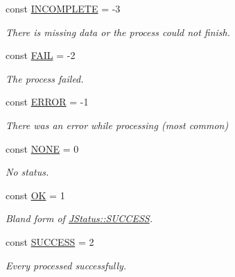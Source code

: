 \begin{DoxyCompactItemize}
\item 
\hypertarget{classJStatus_a7da9c102991a4a5a873fa435e6820dae}{const \hyperlink{classJStatus_a7da9c102991a4a5a873fa435e6820dae}{I\-N\-C\-O\-M\-P\-L\-E\-T\-E} = -\/3}\label{classJStatus_a7da9c102991a4a5a873fa435e6820dae}

\begin{DoxyCompactList}\small\item\em There is missing data or the process could not finish. \end{DoxyCompactList}\item 
\hypertarget{classJStatus_a42def017ffd8cbba31196409472ae94b}{const \hyperlink{classJStatus_a42def017ffd8cbba31196409472ae94b}{F\-A\-I\-L} = -\/2}\label{classJStatus_a42def017ffd8cbba31196409472ae94b}

\begin{DoxyCompactList}\small\item\em The process failed. \end{DoxyCompactList}\item 
\hypertarget{classJStatus_adae6f9cc64c27ec125bbb36731a036c1}{const \hyperlink{classJStatus_adae6f9cc64c27ec125bbb36731a036c1}{E\-R\-R\-O\-R} = -\/1}\label{classJStatus_adae6f9cc64c27ec125bbb36731a036c1}

\begin{DoxyCompactList}\small\item\em There was an error while processing (most common) \end{DoxyCompactList}\item 
\hypertarget{classJStatus_af4a8242bee3345146577233f7481d388}{const \hyperlink{classJStatus_af4a8242bee3345146577233f7481d388}{N\-O\-N\-E} = 0}\label{classJStatus_af4a8242bee3345146577233f7481d388}

\begin{DoxyCompactList}\small\item\em No status. \end{DoxyCompactList}\item 
\hypertarget{classJStatus_a8c12f03c803b6e2dd4408a2fa8e19fb0}{const \hyperlink{classJStatus_a8c12f03c803b6e2dd4408a2fa8e19fb0}{O\-K} = 1}\label{classJStatus_a8c12f03c803b6e2dd4408a2fa8e19fb0}

\begin{DoxyCompactList}\small\item\em Bland form of \hyperlink{classJStatus_a894a1602e2b9594efa57e1a146fde7fa}{J\-Status\-::\-S\-U\-C\-C\-E\-S\-S}. \end{DoxyCompactList}\item 
\hypertarget{classJStatus_a894a1602e2b9594efa57e1a146fde7fa}{const \hyperlink{classJStatus_a894a1602e2b9594efa57e1a146fde7fa}{S\-U\-C\-C\-E\-S\-S} = 2}\label{classJStatus_a894a1602e2b9594efa57e1a146fde7fa}

\begin{DoxyCompactList}\small\item\em Every processed successfully. \end{DoxyCompactList}\end{DoxyCompactItemize}
